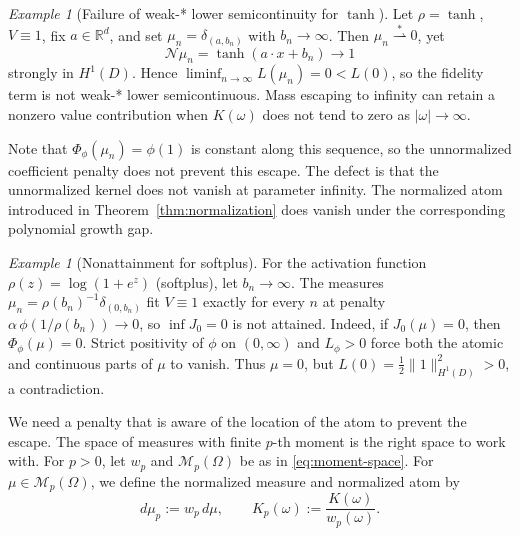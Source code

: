 \documentclass[11pt]{amsart}
\theoremstyle{definition}
\theoremstyle{remark}
\newtheorem{example}[theorem]{Example}
\begin{document}
\begin{example}[Failure of weak-* lower semicontinuity for $\tanh$]
\label{ex:tanh_escape}
Let $\rho = \tanh$, $V \equiv 1$, fix $a\in\mathbb R^d$, and set
$\mu_n = \delta_{(a, b_n)}$ with $b_n \to \infty$. Then
$\mu_n \overset{*}{\rightharpoonup} 0$, yet
\begin{equation*}
	\mathcal{N}\mu_n = \tanh(a \cdot x + b_n) \to 1
\end{equation*}
strongly in $H^1(D)$. Hence
$\liminf_{n\to\infty} L(\mu_n) = 0 < L(0)$, so the fidelity term is not
weak-* lower semicontinuous. Mass escaping to infinity can retain a nonzero
value contribution when $K(\omega)$ does not tend to zero as $|\omega|\to\infty$.

Note that $\Phi_\phi(\mu_n) = \phi(1)$ is constant along this sequence, so the
unnormalized coefficient penalty does not prevent this escape. The defect is
that the unnormalized kernel does not vanish at parameter infinity. The
normalized atom introduced in Theorem~\ref{thm:normalization} does vanish
under the corresponding polynomial growth gap.
\end{example}

\begin{example}[Nonattainment for softplus]
\label{ex:softplus_escape}
For the activation function $\rho(z) = \log(1 + e^z)$ (softplus), let $b_n\to\infty$.
The measures
$\mu_n = \rho(b_n)^{-1}\delta_{(0, b_n)}$ fit $V \equiv 1$ exactly for every
$n$ at penalty $\alpha\,\phi(1/\rho(b_n)) \to 0$, so $\inf J_0 = 0$ is not
attained. Indeed, if $J_0(\mu)=0$, then $\Phi_\phi(\mu)=0$. Strict positivity
of $\phi$ on $(0,\infty)$ and $L_\phi>0$ force both the atomic and continuous
parts of $\mu$ to vanish. Thus $\mu=0$, but
$L(0)=\frac12\|1\|_{H^1(D)}^2>0$, a contradiction.
\end{example}

We need a penalty that is aware of the location of the atom to prevent the escape. 
The space of measures with finite $p$-th moment is the right space to work with.
For $p>0$, let $w_p$ and $\mathcal M_p(\Omega)$ be as in
\eqref{eq:moment-space}. For $\mu\in\mathcal M_p(\Omega)$, we define the
normalized measure and normalized atom by
\begin{equation*}
	d\mu_p:=w_p\,d\mu,
	\qquad
	K_p(\omega):=\frac{K(\omega)}{w_p(\omega)}.
\end{equation*}
\end{document}
